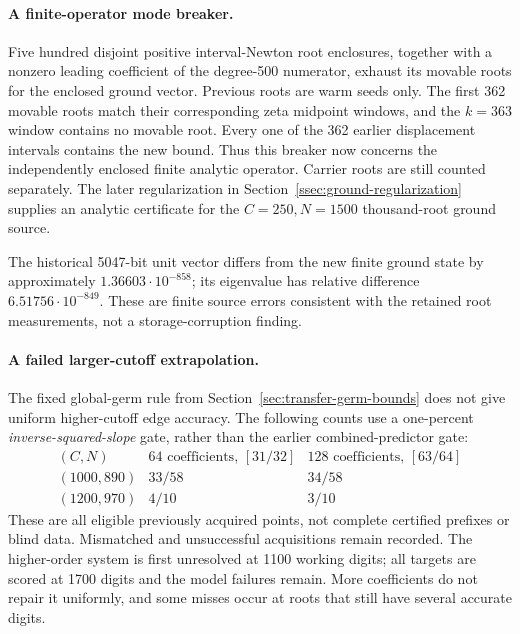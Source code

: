 \paragraph{A finite-operator mode breaker.}
Five hundred disjoint positive interval-Newton root enclosures, together
with a nonzero leading coefficient of the degree-500 numerator, exhaust
its movable roots for the enclosed ground vector. Previous roots are warm
seeds only. The first 362 movable roots match their corresponding zeta
midpoint windows, and the $k=363$ window contains no movable root. Every
one of the 362 earlier displacement intervals contains the new bound.
Thus this breaker now concerns the independently enclosed finite analytic
operator. Carrier roots are still counted separately. The later regularization in
Section~\ref{ssec:ground-regularization} supplies an analytic certificate
for the $C=250,N=1500$ thousand-root ground source.

The historical 5047-bit unit vector differs from the new finite ground
state by approximately $1.36603\cdot10^{-858}$; its eigenvalue has relative
difference $6.51756\cdot10^{-849}$. These are finite source errors consistent
with the retained root measurements, not a storage-corruption finding.

\paragraph{A failed larger-cutoff extrapolation.}
The fixed global-germ rule from Section~\ref{sec:transfer-germ-bounds}
does not give uniform higher-cutoff edge accuracy. The following counts
use a one-percent \emph{inverse-squared-slope} gate, rather than the earlier
combined-predictor gate:
\[
\begin{array}{c|rr}
(C,N)&64\text{ coefficients, }[31/32]&128\text{ coefficients, }[63/64]\\
\hline
(1000,890)&33/58&34/58\\
(1200,970)&4/10&3/10
\end{array}
\]
These are all eligible previously acquired points, not complete certified
prefixes or blind data. Mismatched and unsuccessful acquisitions remain
recorded. The higher-order system is first unresolved at 1100 working
digits; all targets are scored at 1700 digits and the model failures
remain. More coefficients do not repair it uniformly, and some misses
occur at roots that still have several accurate digits.

